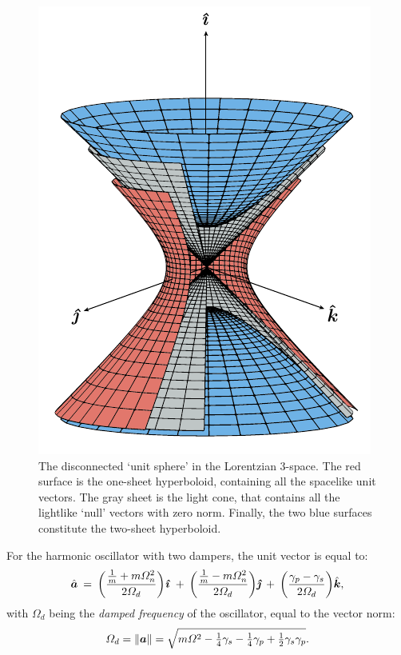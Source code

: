 \begin{figure}[ht!]
    \centering
    \includegraphics[]{media/other/hyperboloid.pdf}
    \caption{The disconnected `unit sphere' in the Lorentzian 3-space. The red surface is the one-sheet hyperboloid, containing all the spacelike unit vectors. The gray sheet is the light cone, that contains all the lightlike `null' vectors with zero norm. Finally, the two blue surfaces constitute the two-sheet hyperboloid.}
    \label{fig:hyperboloids}
\end{figure}

For the harmonic oscillator with two dampers, the unit vector is equal to:
\begin{equation}
    \uvec{a} \:= \:\qty(\frac{\tfrac{1}{m} + m\Omega_n^2}{2\Omega_d})\quati \: + \:\qty(\frac{\tfrac{1}{m} - m\Omega_n^2}{2\Omega_d})\quatj \:+ \:\qty(\frac{\gamma_p - \gamma_s}{2\Omega_d})\quatk,
    \label{eq:ddho_vector}
\end{equation}
with $\Omega_d$ being the \emph{damped frequency} of the oscillator, equal to the vector norm:
\begin{equation}
    \Omega_d = \norm{\vec{a}} = \sqrt{m\Omega^2 - \tfrac{1}{4}\gamma_s - \tfrac{1}{4}\gamma_p + \tfrac{1}{2}\gamma_s \gamma_p}.
\end{equation}

